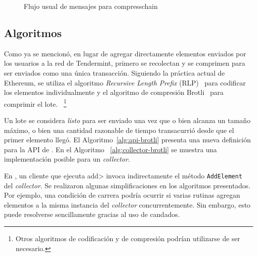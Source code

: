 \begin{figure}
  \caption{Flujo usual de mensajes para compresschain}
  \label{fig:compresschain-flow}
\end{figure}

\subsection{Algoritmos}


%
%

%

Como ya se mencionó, en lugar de agregar directamente elementos enviados por los usuarios a la red de Tendermint,
primero se recolectan y se comprimen para ser enviados como una única transacción.
Siguiendo la práctica actual de Ethereum, se utiliza el algoritmo
\textit{Recursive Length Prefix} (RLP)~\cite{ethereum} para codificar los elementos individualmente
y el algoritmo de compresión Brotli~\cite{brotli.compressor} para comprimir el lote.
~\footnote{ Otros algoritmos de codificación y de compresión podrían utilizarse de ser necesario.}

%
Un lote se considera \textit{listo} para ser enviado una vez que o bien alcanza un tamaño máximo,
o bien una cantidad razonable de tiempo transacurrió desde que el primer elemento llegó. 
%
El Algoritmo~\ref{alg:api-brotli} presenta una nueva definición para la API de \setchain.
En el Algoritmo ~\ref{alg:collector-brotli} se muestra una implementación posible para un
\textit{collector}.





%
En \compresschain, un cliente que ejecuta \<add> invoca indirectamente el método \texttt{AddElement}
del \textit{collector}.
%
Se realizaron algunas simplificaciones en los algoritmos presentados. Por ejemplo, una condición de carrera
podría ocurrir si varias rutinas agregan elementos a la misma instancia del \textit{collector} concurrentemente.
Sin embargo, esto puede resolverse sencillamente gracias al uso de candados.


